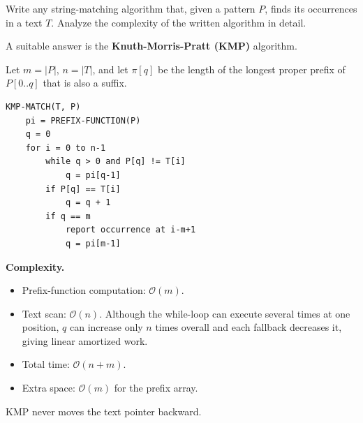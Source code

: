\documentclass[11pt,a4paper]{article}
\newcommand{\Oh}{\mathcal{O}}
\begin{document}
\begin{qaquestion}
Write any string-matching algorithm that, given a pattern \(P\), finds its occurrences in a text \(T\). Analyze the complexity of the written algorithm in detail.
\end{qaquestion}
\begin{qaanswer}[Answer 4(a)]
A suitable answer is the \textbf{Knuth-Morris-Pratt (KMP)} algorithm.

Let \(m=|P|\), \(n=|T|\), and let \(\pi[q]\) be the length of the longest proper prefix of \(P[0..q]\) that is also a suffix.

\begin{lstlisting}
KMP-MATCH(T, P)
    pi = PREFIX-FUNCTION(P)
    q = 0
    for i = 0 to n-1
        while q > 0 and P[q] != T[i]
            q = pi[q-1]
        if P[q] == T[i]
            q = q + 1
        if q == m
            report occurrence at i-m+1
            q = pi[m-1]
\end{lstlisting}

\textbf{Complexity.}
\begin{itemize}[leftmargin=*]
\item Prefix-function computation: \(\Oh(m)\).
\item Text scan: \(\Oh(n)\). Although the while-loop can execute several times at one position, \(q\) can increase only \(n\) times overall and each fallback decreases it, giving linear amortized work.
\item Total time: \(\boxed{\Oh(n+m)}\).
\item Extra space: \(\boxed{\Oh(m)}\) for the prefix array.
\end{itemize}
KMP never moves the text pointer backward.
\end{qaanswer}
\end{document}
